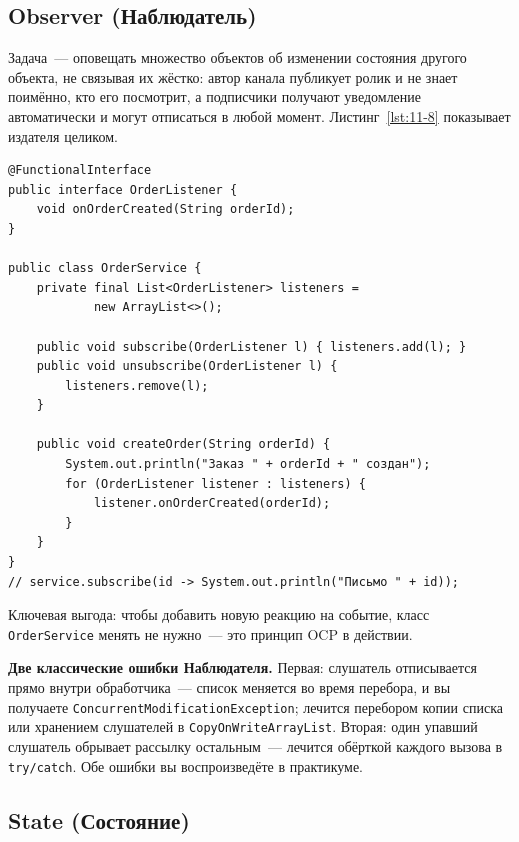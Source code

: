 \subsection{Observer (Наблюдатель)}

Задача~--- оповещать множество объектов об изменении состояния другого объекта,
не связывая их жёстко: автор канала публикует ролик и не знает поимённо, кто его
посмотрит, а подписчики получают уведомление автоматически и могут отписаться в
любой момент. Листинг~\ref{lst:11-8} показывает издателя целиком.

\begin{listing}[H]
\begin{verbatim}
@FunctionalInterface
public interface OrderListener {
    void onOrderCreated(String orderId);
}

public class OrderService {
    private final List<OrderListener> listeners =
            new ArrayList<>();

    public void subscribe(OrderListener l) { listeners.add(l); }
    public void unsubscribe(OrderListener l) {
        listeners.remove(l);
    }

    public void createOrder(String orderId) {
        System.out.println("Заказ " + orderId + " создан");
        for (OrderListener listener : listeners) {
            listener.onOrderCreated(orderId);
        }
    }
}
// service.subscribe(id -> System.out.println("Письмо " + id));
\end{verbatim}
\caption{Издатель рассылает события подписчикам}
\label{lst:11-8}
\end{listing}

Ключевая выгода: чтобы добавить новую реакцию на событие, класс
\texttt{OrderService} менять не нужно~--- это принцип OCP в действии.

\begin{oshibka}
\textbf{Две классические ошибки Наблюдателя.} Первая: слушатель отписывается
прямо внутри обработчика~--- список меняется во время перебора, и вы получаете
\texttt{ConcurrentModificationException}; лечится перебором копии списка или
хранением слушателей в \texttt{CopyOnWriteArrayList}. Вторая: один упавший
слушатель обрывает рассылку остальным~--- лечится обёрткой каждого вызова в
\texttt{try/catch}. Обе ошибки вы воспроизведёте в практикуме.
\end{oshibka}

\subsection{State (Состояние)}

